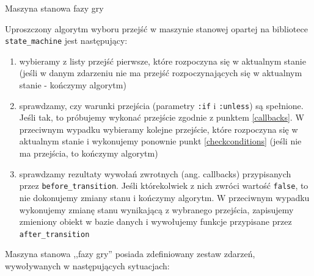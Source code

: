 \documentclass[11pt,twoside]{report}
\begin{document}
\begin{listing}
  
  \caption{Maszyna stanowa fazy gry}
  \label{listing:statemachine-phase}
\end{listing}

Uproszczony algorytm wyboru przejść w maszynie stanowej opartej na
bibliotece \texttt{state\_machine} jest następujący:

\begin{enumerate}
\item wybieramy z listy przejść pierwsze, które rozpoczyna się w
  aktualnym stanie (jeśli w danym zdarzeniu nie ma przejść
  rozpoczynających się w aktualnym stanie - kończymy
  algorytm) \label{selectfirst}
\item sprawdzamy, czy warunki przejścia (parametry \texttt{:if} i
  \texttt{:unless}) są spełnione\label{checkconditions}. Jeśli tak, to
  próbujemy wykonać przejście zgodnie z punktem \ref{callbacks}. W
  przeciwnym wypadku wybieramy kolejne przejście, które rozpoczyna się
  w aktualnym stanie i wykonujemy ponownie punkt \ref{checkconditions}
  (jeśli nie ma przejścia, to kończymy algorytm)
\item sprawdzamy rezultaty wywołań zwrotnych (ang. callbacks)
  przypisanych przez \texttt{before\_transition}. Jeśli którekolwiek z
  nich zwróci wartość \texttt{false}, to nie dokonujemy zmiany stanu i
  kończymy algorytm. W przeciwnym wypadku wykonujemy zmianę stanu
  wynikającą z wybranego przejścia, zapisujemy zmieniony obiekt w
  bazie danych i wywołujemy funkcje przypisane przez
  \texttt{after\_transition} \label{callbacks}
\end{enumerate}

Maszyna stanowa ,,fazy gry'' posiada zdefiniowany zestaw zdarzeń,
wywoływanych w następujących sytuacjach:
\end{document}
